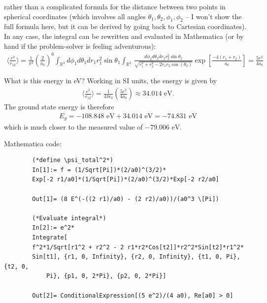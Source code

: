 \documentclass{book}
\theoremstyle{definition}
\newcommand{\f}[2]{\frac{#1}{#2}}
\newcommand{\lp}{\left(}
\newcommand{\rp}{\right)}
\newcommand{\lb}{\left[}
\newcommand{\rb}{\right]}
\begin{document}
\begin{enumerate}[label=(\alph*)]
	rather than a complicated formula for the distance between two points in spherical coordinates (which involves all angles $\theta_1,\theta_2,\phi_1,\phi_2$ -- I won't show the full formula here, but it can be derived by going back to Cartesian coordinates). In any case, the integral can be rewritten and evaluated in Mathematica (or by hand if the problem-solver is feeling adventurous):
	\begin{align*}
		\bigg\langle \f{e^2}{r_{12}}\bigg\rangle 
		= \f{1}{\pi^2}\lp \f{2}{a_0} \rp^6  \int_{\mathbb{R}^3} d\phi_1 d\theta_1 dr_1 r_1^2\sin\theta_1  \int_{\mathbb{R}^3}   \, 
		\f{d\phi_2 d\theta_2 dr_2 r_2^2\sin\theta_2}{\sqrt{r_1^2 + r_2^2 - 2r_1r_2\cos(\theta_2)}}\exp\lb \f{-4 (r_1 + r_2)}{a_0} \rb
		= \boxed{\f{5e^2}{4a_0}}
	\end{align*}  
	
	What is this energy in eV? Working in SI units, the energy is given by 
	\begin{align*}
		\bigg\langle \f{e^2}{r_{12}}\bigg\rangle = \f{1}{4\pi \epsilon_0} \lp \f{5e^2}{4a_0} \rp \approx 34.014 \text{ eV}. 
	\end{align*}
	The ground state energy is therefore 
	\begin{align*}
		E_g = -108.848 \text{ eV} + 34.014 \text{ eV} = \boxed{-74.831 \text{ eV}}
	\end{align*}
	which is much closer to the measured value of $-79.006 \text{ eV}$.
	
	
	
	
	
	
	
	
	
	Mathematica code:
	\begin{lstlisting}
		(*define \psi_total^2*)
		In[1]:= f = (1/Sqrt[Pi])*(2/a0)^(3/2)*
		Exp[-2 r1/a0]*(1/Sqrt[Pi])*(2/a0)^(3/2)*Exp[-2 r2/a0]
		
		Out[1]= (8 E^(-((2 r1)/a0) - (2 r2)/a0))/(a0^3 \[Pi])
		
		(*Evaluate integral*)
		In[2]:= e^2*
		Integrate[
		f^2*1/Sqrt[r1^2 + r2^2 - 2 r1*r2*Cos[t2]]*r2^2*Sin[t2]*r1^2*
		Sin[t1], {r1, 0, Infinity}, {r2, 0, Infinity}, {t1, 0, Pi}, {t2, 0,
			Pi}, {p1, 0, 2*Pi}, {p2, 0, 2*Pi}]
		
		Out[2]= ConditionalExpression[(5 e^2)/(4 a0), Re[a0] > 0]
	\end{lstlisting}
	
	
	
	
	

\end{enumerate}
\end{document}
